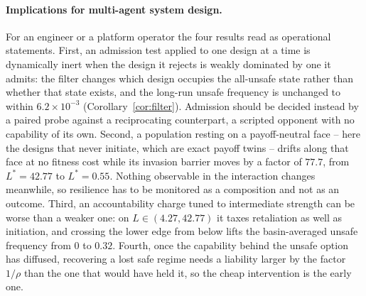 \paragraph{Implications for multi-agent system design.}
For an engineer or a platform operator the four results read as operational
statements. First, an admission test applied to one design at a time is
dynamically inert when the design it rejects is weakly dominated by one it
admits: the filter changes which design occupies the all-unsafe state rather
than whether that state exists, and the long-run unsafe frequency is unchanged
to within $6.2\times10^{-3}$ (Corollary~\ref{cor:filter}). Admission should be
decided instead by a paired probe against a reciprocating counterpart, a
scripted opponent with no capability of its own. Second, a population resting
on a payoff-neutral face -- here the designs that never initiate, which are
exact payoff twins -- drifts along that face at no fitness cost while its
invasion barrier moves by a factor of $77.7$, from $L^{*}=42.77$ to
$L^{*}=0.55$. Nothing observable in the interaction changes meanwhile, so
resilience has to be monitored as a composition and not as an outcome. Third,
an accountability charge tuned to intermediate strength can be worse than a
weaker one: on $L\in(4.27,42.77)$ it taxes retaliation as well as initiation,
and crossing the lower edge from below lifts the basin-averaged unsafe
frequency from $0$ to $0.32$. Fourth, once the capability behind the unsafe
option has diffused, recovering a lost safe regime needs a liability larger by
the factor $1/\rho$ than the one that would have held it, so the cheap
intervention is the early one.
